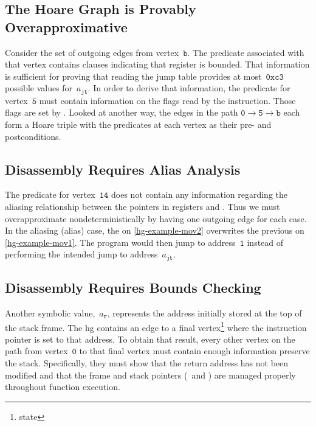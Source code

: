 \subsection{The Hoare Graph is Provably Overapproximative}
Consider the set of outgoing edges from vertex~$\mathtt{b}$.
The predicate associated with that vertex contains clauses indicating that register  is bounded.
That information is sufficient for proving that reading the jump table provides at most~$\mathtt{0xc3}$ possible values for~$a_\mathtt{jt}$.
In order to derive that information, the predicate for vertex~$\mathtt{5}$ must contain information on the flags read by the  instruction.
Those flags are set by .
Looked at another way, the edges in the path $\mathtt{0}\rightarrow\mathtt{5}\rightarrow\mathtt{b}$ each form a Hoare triple with the predicates at each vertex as their pre- and postconditions.%

\subsection{Disassembly Requires Alias Analysis}
The predicate for vertex~$\mathtt{14}$ does not contain any information regarding the aliasing relationship between the pointers in registers  and .
Thus we must overapproximate nondeterministically by having one outgoing edge for each case.
In the aliasing (\gls{alias}) case, the  on \cref{hg-example-mov2} overwrites the previous  on \cref{hg-example-mov1}.
The program would then jump to address~$\mathtt{1}$ instead of performing the intended jump to address~$a_\mathtt{jt}$.

\subsection{Disassembly Requires Bounds Checking}
Another symbolic value,~$a_\mathtt{r}$, represents the address initially stored at the top of the stack frame.
The \ac{hg} contains an edge to a final vertex\footnote{state} where the instruction pointer is set to that address.
To obtain that result, every other vertex on the path from vertex~$\mathtt{0}$ to that final vertex must contain enough information preserve the stack.
Specifically, they must show that the return address has not been modified and that the frame and stack pointers (\rbp\ and \rsp) are managed properly throughout function execution.

